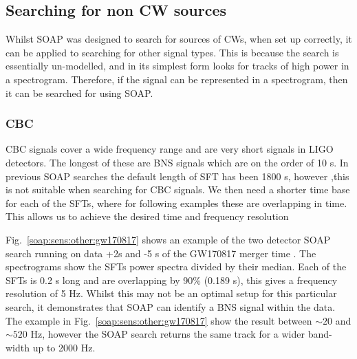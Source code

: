 \subsection{\label{soap:sens:other} Searching for non CW sources}

Whilst SOAP was designed to search for sources of \glspl{CW}, when set up correctly, it can be applied to searching for other signal types.
This is because the search is essentially un-modelled, and in its simplest form looks for tracks of high power in a spectrogram.
Therefore, if the signal can be represented in a spectrogram, then it can be searched for using SOAP.

\subsubsection{CBC}

CBC signals cover a wide frequency range and are very short signals in \gls{LIGO} detectors. 
The longest of these are \gls{BNS} signals which are on the order of 10 s. 
In previous SOAP searches the default length of \gls{SFT} has been 1800 s, however ,this is not suitable when searching for \gls{CBC} signals.
We then need a shorter time base for each of the \glspl{SFT}, where for following examples these are overlapping in time.
This allows us to achieve the desired time and frequency resolution

Fig.~\ref{soap:sens:other:gw170817} shows an example of the two detector SOAP search running on data +2s and -5 s of the GW170817 merger time \citep{abbott2017GW170817Observation}. 
The spectrograms show the \glspl{SFT} power spectra divided by their median.
Each of the \glspl{SFT} is 0.2 s long and are overlapping by 90\% (0.189 s), this gives a frequency resolution of 5 Hz. 
Whilst this may not be an optimal setup for this particular search, it demonstrates that SOAP can identify a \gls{BNS} signal within the data. 
The example in Fig.~\ref{soap:sens:other:gw170817} show the result between $\sim 20$ and $\sim 520$ Hz, however the SOAP search returns the same track for a wider band-width up to 2000 Hz. 

